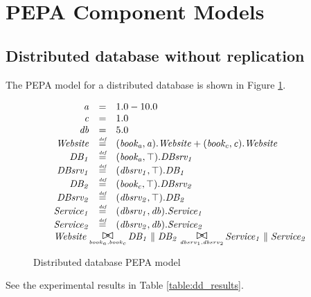 %
%

\section{PEPA Component Models}

%
%
\subsection{Distributed database without replication}

The PEPA model for a distributed database is shown in Figure \ref{figure:pepa_dd_model}.

\begin{figure}
	\caption{Distributed database PEPA model}
	\label{figure:pepa_dd_model}
	\centering
\begin{displaymath}
	\begin{array}{rcl}
		\mathit{a} & = & 1.0-10.0\\
		\mathit{c} & = & 1.0\\
		\mathit{db} & = & 5.0\\
		[0.0ex]		\mathit{Website} & \rmdef & (\mathit{book_a},\mathit{a}).\mathit{Website}+(\mathit{book_c},\mathit{c}).\mathit{Website}\\
		\mathit{DB_1} & \rmdef & (\mathit{book_a},\top).\mathit{DBsrv_1}\\
		\mathit{DBsrv_1} & \rmdef & (\mathit{dbsrv_1},\top).\mathit{DB_1}\\
		\mathit{DB_2} & \rmdef & (\mathit{book_c},\top).\mathit{DBsrv_2}\\
		\mathit{DBsrv_2} & \rmdef & (\mathit{dbsrv_2},\top).\mathit{DB_2}\\
		\mathit{Service_1} & \rmdef & (\mathit{dbsrv_1},\mathit{db}).\mathit{Service_1}\\
		\mathit{Service_2} & \rmdef & (\mathit{dbsrv_2},\mathit{db}).\mathit{Service_2}\\
		[0.0ex]		\multicolumn{3}{l}{\mathit{Website}\sync{book_a,book_c}\mathit{DB_1}\parallel\mathit{DB_2}\sync{dbsrv_1,dbsrv_2}\mathit{Service_1}\parallel\mathit{Service_2}}\\
		[0.0ex]	\end{array}
\end{displaymath}
\end{figure}

See the experimental results in Table \ref{table:dd_results}.

